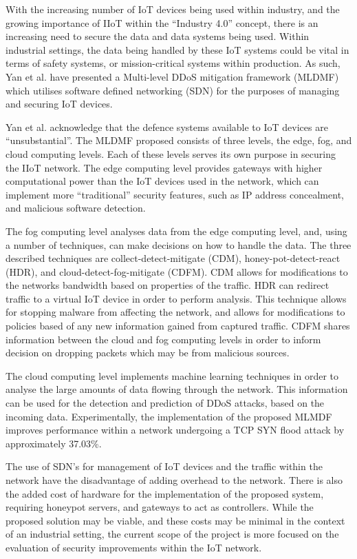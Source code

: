 With the increasing number of IoT devices being used within industry, and the
growing importance of IIoT within the ``Industry 4.0'' concept, there is an
increasing need to secure the data and data systems being used. Within
industrial settings, the data being handled by these IoT systems could be vital
in terms of safety systems, or mission-critical systems within production. As
such, Yan et al. have presented a Multi-level DDoS mitigation
framework (MLDMF) which utilises software defined networking (SDN) for the
purposes of managing and securing IoT devices\cite{iiot_2019}.

Yan et al. acknowledge that the defence systems available to IoT devices are
``unsubstantial''. The MLDMF proposed consists of three levels, the edge, fog,
and cloud computing levels. Each of these levels serves its own purpose in
securing the IIoT network. The edge computing level provides gateways with
higher computational power than the IoT devices used in the network, which can
implement more ``traditional'' security features, such as IP address
concealment, and malicious software detection.

The fog computing level analyses data from the edge computing level, and, using
a number of techniques, can make decisions on how to handle the data. The three
described techniques are collect-detect-mitigate (CDM), honey-pot-detect-react
(HDR), and cloud-detect-fog-mitigate (CDFM). CDM allows for modifications to the
networks bandwidth based on properties of the traffic. HDR can redirect traffic
to a virtual IoT device in order to perform analysis. This technique allows for
stopping malware from affecting the network, and allows for modifications to
policies based of any new information gained from captured traffic. CDFM shares
information between the cloud and fog computing levels in order to inform
decision on dropping packets which may be from malicious sources.

The cloud computing level implements machine learning techniques in order to
analyse the large amounts of data flowing through the network. This information
can be used for the detection and prediction of DDoS attacks, based on the
incoming data. Experimentally, the implementation of the proposed MLMDF improves
performance within a network undergoing a TCP SYN flood attack by approximately
37.03\%.

The use of SDN's for management of IoT devices and the traffic within the
network have the disadvantage of adding overhead to the network. There is also
the added cost of hardware for the implementation of the proposed system,
requiring honeypot servers, and gateways to act as controllers. While the
proposed solution may be viable, and these costs may be minimal in the context
of an industrial setting, the current scope of the project is more focused on
the evaluation of security improvements within the IoT network.
